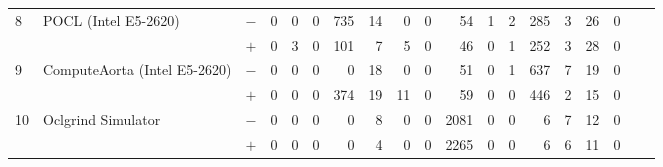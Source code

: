 \begin{tabular}{lll | rrrrrrrr | rrrrrrrr }
\hline
\multirow{ 2}{*}{8} & \multirow{ 2}{*}{POCL (Intel E5-2620)} & $-$ & 0 & 0 & 0 & 735 & 14 & 0 & 0       & 54 & 1 & 2 & 285 & 3 & 26 & 0 \\& & $+$ & 0 & 3 & 0 & 101 & 7 & 5 & 0 & 46 & 0 & 1 & 252 & 3 & 28 & 0 \\
\hline
\multirow{ 2}{*}{9} & \multirow{ 2}{*}{ComputeAorta (Intel E5-2620)} & $-$ & 0 & 0 & 0 & 0 & 18 & 0 & 0       & 51 & 0 & 1 & 637 & 7 & 19 & 0 \\& & $+$ & 0 & 0 & 0 & 374 & 19 & 11 & 0 & 59 & 0 & 0 & 446 & 2 & 15 & 0 \\
\hline
\multirow{ 2}{*}{10} & \multirow{ 2}{*}{Oclgrind Simulator} & $-$ & 0 & 0 & 0 & 0 & 8 & 0 & 0       & 2081 & 0 & 0 & 6 & 7 & 12 & 0 \\& & $+$ & 0 & 0 & 0 & 0 & 4 & 0 & 0 & 2265 & 0 & 0 & 6 & 6 & 11 & 0 \\
  \bottomrule
\end{tabular}

